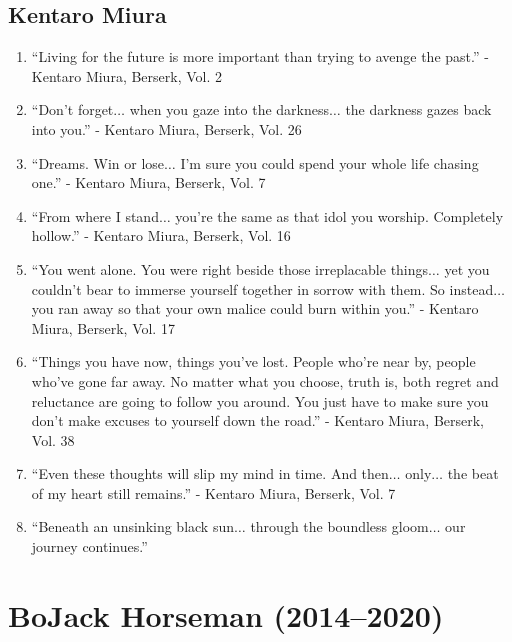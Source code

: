 \documentclass{book}
\numberwithin{equation}{section}
\begin{document}
\section{Kentaro Miura}
\begin{enumerate}
    \item ``Living for the future is more important than trying to avenge the past.'' - Kentaro Miura, Berserk, Vol. 2
    \item ``Don't forget$\ldots$ when you gaze into the darkness$\ldots$ the darkness gazes back into you.'' - Kentaro Miura, Berserk, Vol. 26
    \item ``Dreams. Win or lose$\ldots$ I'm sure you could spend your whole life chasing one.'' - Kentaro Miura, Berserk, Vol. 7
    \item ``From where I stand$\ldots$ you're the same as that idol you worship. Completely hollow.'' - Kentaro Miura, Berserk, Vol. 16
    \item ``You went alone. You were right beside those irreplacable things$\ldots$ yet you couldn't bear to immerse yourself together in sorrow with them. So instead$\ldots$ you ran away so that your own malice could burn within you.'' - Kentaro Miura, Berserk, Vol. 17
    \item ``Things you have now, things you've lost. People who're near by, people who've gone far away. No matter what you choose, truth is, both regret and reluctance are going to follow you around. You just have to make sure you don't make excuses to yourself down the road.'' - Kentaro Miura, Berserk, Vol. 38
    \item ``Even these thoughts will slip my mind in time. And then$\ldots$ only$\ldots$ the beat of my heart still remains.'' - Kentaro Miura, Berserk, Vol. 7
    \item ``Beneath an unsinking black sun$\ldots$ through the boundless gloom$\ldots$ our journey continues.''
\end{enumerate}


\chapter{BoJack Horseman (2014--2020)}
\end{document}
